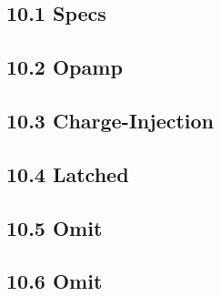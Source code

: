 \subsection{10.1 Specs}
\subsection{10.2 Opamp}
\subsection{10.3 Charge-Injection}
\subsection{10.4 Latched}
\subsection{10.5 Omit}
\subsection{10.6 Omit}
